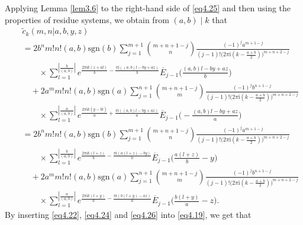 \documentclass[reqno]{amsart}
\numberwithin{equation}{section}
\begin{document}
Applying Lemma \ref{lem3.6} to the right-hand side of \eqref{eq4.25} and then using the properties of residue systems, we obtain from $(a,b)\mid k$ that
\begin{eqnarray}\label{eq4.26}
&&\widetilde{c}_{k}(m,n|a,b,y,z)\nonumber\\
&&=2b^{n}m!n!(a,b)\mathrm{sgn}(b)\sum_{j=1}^{m+1}\binom{m+n+1-j}{n}\frac{(-1)^{j}a^{m+1-j}}{(j-1)!\bigl(2\pi\mathrm{i}(k-\frac{a+b}{2})\bigl)^{m+n+2-j}}\nonumber\\
&&\qquad\times\sum_{l=1}^{|\frac{b}{(a,b)}|}e^{\frac{2\pi\mathrm{i}k(z+\overline{a}l)}{b}-\frac{\pi\mathrm{i}((a,b)l-by+az)}{b}}
\overline{E}_{j-1}\biggl(\frac{(a,b)l-by+az}{b}\biggl)\nonumber\\
&&\quad+2a^{m}m!n!(a,b)\mathrm{sgn}(a)\sum_{j=1}^{n+1}\binom{m+n+1-j}{m}\frac{(-1)^{j}b^{n+1-j}}{(j-1)!\bigl(2\pi\mathrm{i}(k-\frac{a+b}{2})\bigl)^{m+n+2-j}}\nonumber\\
&&\qquad\times\sum_{l=1}^{|\frac{a}{(a,b)}|}e^{\frac{2\pi\mathrm{i}k(y-\overline{b}l)}{a}+\frac{\pi\mathrm{i}((a,b)l-by+az)}{a}}
\overline{E}_{j-1}\biggl(-\frac{(a,b)l-by+az}{a}\biggl)\nonumber\\
&&=2b^{n}m!n!(a,b)\mathrm{sgn}(b)\sum_{j=1}^{m+1}\binom{m+n+1-j}{n}\frac{(-1)^{j}a^{m+1-j}}{(j-1)!\bigl(2\pi\mathrm{i}(k-\frac{a+b}{2})\bigl)^{m+n+2-j}}\nonumber\\
&&\qquad\times\sum_{l=1}^{|\frac{b}{(a,b)}|}e^{\frac{2\pi\mathrm{i}k(l+z)}{b}-\frac{\pi\mathrm{i}(a(l+z)-by)}{b}}
\overline{E}_{j-1}\biggl(\frac{a(l+z)}{b}-y\biggl)\nonumber\\
&&\quad+2a^{m}m!n!(a,b)\mathrm{sgn}(a)\sum_{j=1}^{n+1}\binom{m+n+1-j}{m}\frac{(-1)^{j}b^{n+1-j}}{(j-1)!\bigl(2\pi\mathrm{i}(k-\frac{a+b}{2})\bigl)^{m+n+2-j}}\nonumber\\
&&\qquad\times\sum_{l=1}^{|\frac{a}{(a,b)}|}e^{\frac{2\pi\mathrm{i}k(l+y)}{a}-\frac{\pi\mathrm{i}(b(l+y)-az)}{a}}
\overline{E}_{j-1}\biggl(\frac{b(l+y)}{a}-z\biggl).
\end{eqnarray}
By inserting \eqref{eq4.22}, \eqref{eq4.24} and \eqref{eq4.26} into \eqref{eq4.19}, we get that
\end{document}
